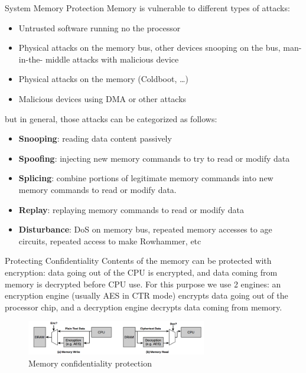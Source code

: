 \begin{section}{System Memory Protection}
  Memory is vulnerable to different types of attacks:
  \begin{itemize}
    \item Untrusted software running no the processor
    \item Physical attacks on the memory bus, other devices snooping on the bus, man-in-the- middle attacks with malicious device
    \item Physical attacks on the memory (Coldboot, \dots)
    \item Malicious devices using DMA or other attacks
  \end{itemize}
  but in general, those attacks can be categorized as follows:
  \begin{itemize}
    \item \textbf{Snooping}: reading data content passively
    \item \textbf{Spoofing}: injecting new memory commands to try to read or modify data
    \item \textbf{Splicing}: combine portions of legitimate memory commands into new memory commands
      to read or modify data.
    \item \textbf{Replay}: replaying memory commands to read or modify data
    \item \textbf{Disturbance}: DoS on memory bus, repeated memory accesses to age circuits,
      repeated access to make Rowhammer, etc
  \end{itemize}
  
  \begin{subsection}{Protecting Confidentiality}
    Contents of the memory can be protected with encryption: data going out of the CPU is encrypted,
    and data coming from memory is decrypted before CPU use.
    For this purpose we use 2 engines: an encryption engine (usually AES in CTR mode) encrypts data
    going out of the processor chip, and a decryption engine decrypts data coming from memory.

    \begin{figure}[H]
      \centering
      \includegraphics[width=0.7\textwidth]{img/hardware/memory confidentiality.png}
      \caption{Memory confidentiality protection}
    \end{figure}
  \end{subsection}


\end{section}
